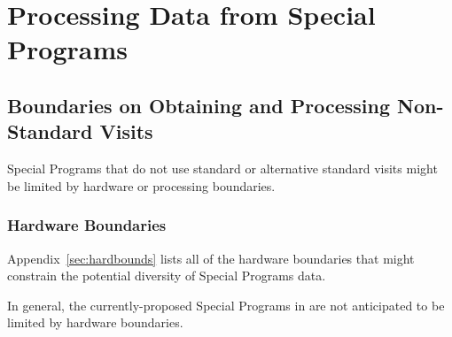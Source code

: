 \section{Processing Data from Special Programs}\label{sec:proc}






\subsection{Boundaries on Obtaining and Processing Non-Standard Visits} \label{ssec:proc_bounds}

Special Programs that do not use standard or alternative standard visits
might be limited by hardware or processing boundaries.

\subsubsection{Hardware Boundaries}\label{ssec:proc_bounds_hardware}

Appendix~\ref{sec:hardbounds} lists all of the hardware boundaries that 
might constrain the potential diversity of Special Programs data.

In general, the currently-proposed Special Programs in 
are not anticipated to be limited by hardware boundaries.

